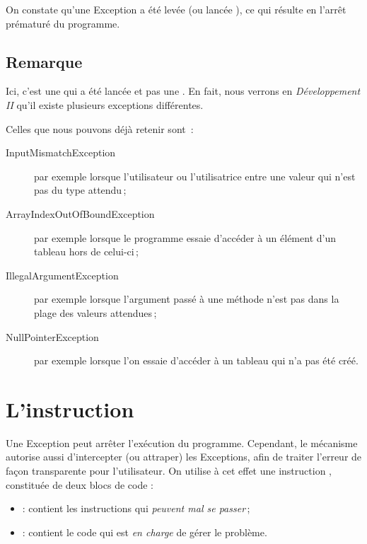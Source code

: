On constate qu'une Exception a été levée (ou \og lancée \fg), ce qui résulte en l'arrêt prématuré du programme.


\subsection*{Remarque}

Ici, c'est une  qui a été lancée et pas une . En fait, nous verrons en \textit{Développement II} qu'il existe plusieurs exceptions différentes. 

Celles que nous pouvons déjà retenir sont~:

\begin{description}

	\item[InputMismatchException] par exemple lorsque l'utilisateur ou l'utilisatrice entre une valeur qui n'est pas du type attendu\,;

	\item[ArrayIndexOutOfBoundException] par exemple lorsque le programme essaie d'accéder à un élément d'un tableau hors de celui-ci\,;

	\item[IllegalArgumentException] par exemple lorsque l'argument passé à une méthode n'est pas dans la plage des valeurs attendues\,;

	\item[NullPointerException] par exemple lorsque l'on essaie d'accéder à un tableau qui n'a pas été créé.

\end{description}

\section{L'instruction }
Une Exception peut arrêter l'exécution du programme. Cependant, le mécanisme autorise aussi d'intercepter (ou \og attraper\fg) les Exceptions, afin de traiter l'erreur de façon transparente pour l'utilisateur. On utilise à cet effet une instruction , constituée de deux blocs de code :
\begin{itemize}
\item {} : contient les instructions qui \emph{peuvent mal se passer}\,;
\item {} : contient le code qui est \emph{en charge} de gérer le problème.
\end{itemize}

